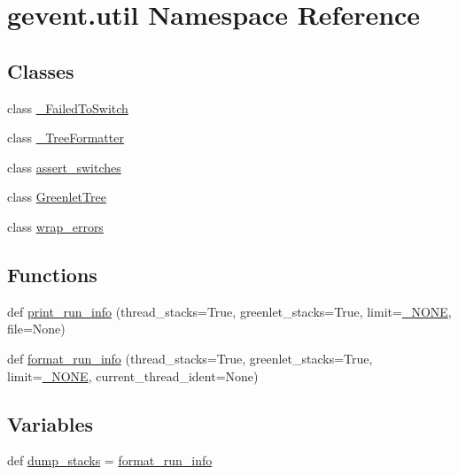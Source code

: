 \hypertarget{namespacegevent_1_1util}{}\section{gevent.\+util Namespace Reference}
\label{namespacegevent_1_1util}
\subsection*{Classes}
\begin{DoxyCompactItemize}
\item 
class \hyperlink{classgevent_1_1util_1_1___failed_to_switch}{\+\_\+\+Failed\+To\+Switch}
\item 
class \hyperlink{classgevent_1_1util_1_1___tree_formatter}{\+\_\+\+Tree\+Formatter}
\item 
class \hyperlink{classgevent_1_1util_1_1assert__switches}{assert\+\_\+switches}
\item 
class \hyperlink{classgevent_1_1util_1_1_greenlet_tree}{Greenlet\+Tree}
\item 
class \hyperlink{classgevent_1_1util_1_1wrap__errors}{wrap\+\_\+errors}
\end{DoxyCompactItemize}
\subsection*{Functions}
\begin{DoxyCompactItemize}
\item 
def \hyperlink{namespacegevent_1_1util_a5e6c937d41783b4b331bf067bb66575d}{print\+\_\+run\+\_\+info} (thread\+\_\+stacks=True, greenlet\+\_\+stacks=True, limit=\hyperlink{classgevent_1_1__util_1_1___n_o_n_e}{\+\_\+\+N\+O\+NE}, file=None)
\item 
def \hyperlink{namespacegevent_1_1util_a090199c0559180f496b56c8352241891}{format\+\_\+run\+\_\+info} (thread\+\_\+stacks=True, greenlet\+\_\+stacks=True, limit=\hyperlink{classgevent_1_1__util_1_1___n_o_n_e}{\+\_\+\+N\+O\+NE}, current\+\_\+thread\+\_\+ident=None)
\end{DoxyCompactItemize}
\subsection*{Variables}
\begin{DoxyCompactItemize}
\item 
def \hyperlink{namespacegevent_1_1util_aa4740cf4e565f83d9965dd88af403f48}{dump\+\_\+stacks} = \hyperlink{namespacegevent_1_1util_a090199c0559180f496b56c8352241891}{format\+\_\+run\+\_\+info}
\end{DoxyCompactItemize}


